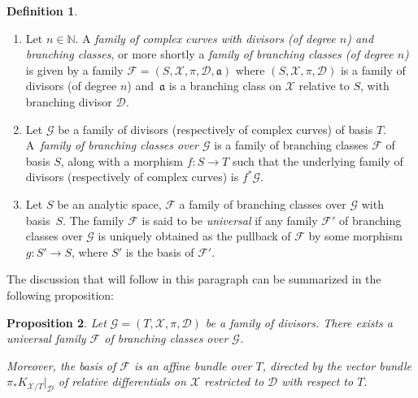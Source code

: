 \documentclass[JEP,XML,SOM,Unicode,NoEqCountersInSection,published]{cedram}
\newcommand{\N}{\mathbb N}
\theoremstyle{definition}
\newtheorem{definition}{Definition}[subsection]
\theoremstyle{plain}
\newtheorem{proposition}[definition]{Proposition}
\begin{document}
\skpt
\begin{definition}\label{definition_families_bc}
\begin{enumerate}
\item
Let $n \in \N$.
A \emph{family of complex curves with divisors (of degree $n$) and branching classes}, or more shortly a \emph{family of branching classes (of degree $n$)} is given by a family $\mathcal F = (S, \mathcal X, \pi, \mathcal D, \mathfrak a)$ where $(S, \mathcal X, \pi, \mathcal D)$ is a family of divisors (of degree $n$) and~$\mathfrak a$ is a branching class on $\mathcal X$ relative to $S$, with branching divisor $\mathcal D$.
\item
Let $\mathcal G$ be a family of divisors (respectively of complex curves) of basis $T$.
A~\emph{family of branching classes over $\mathcal G$} is a family of branching classes $\mathcal F$ of basis $S$, along with a morphism $f: S \to T$ such that the underlying family of divisors (respectively of complex curves) is $f^*\mathcal G$.
\item[(iii)]
Let $S$ be an analytic space, $\mathcal F$ a family of branching classes over $\mathcal G$ with basis~$S$.
The family $\mathcal F$ is said to be \emph{universal} if any family $\mathcal F'$ of branching classes over $\mathcal G$ is uniquely obtained as the pullback of $\mathcal F$ by some morphism $g: S' \to S$, where $S'$ is the basis of $\mathcal F'$.
\end{enumerate}
\end{definition}

The discussion that will follow in this paragraph can be summarized in the following proposition:

\begin{proposition}\label{proposition_universal_family_bc_over_divisor}
Let $\mathcal G = (T, \mathcal X, \pi, \mathcal D)$ be a family of divisors.
There exists a universal family $\mathcal F$ of branching classes over $\mathcal G$.

Moreover, the basis of $\mathcal F$ is an affine bundle over $T$, directed by the vector bundle $\pi_*K_{\mathcal X/T}|_{\mathcal D}$ of relative differentials on $\mathcal X$ restricted to $\mathcal D$ with respect to $T$.
\end{proposition}
\end{document}
